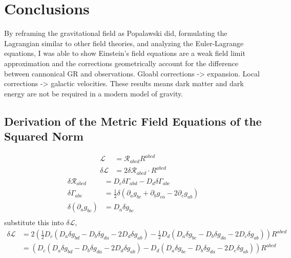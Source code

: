 \documentclass[aps,prd,preprint]{revtex4-1}
\begin{document}
\section*{Conclusions}
By reframing the gravitational field as Popalawski did, formulating the Lagrangian similar to other field theories, and analyzing the Euler-Lagrange equations, I was able to show Einstein's field equations are a weak field limit approximation and the corrections geometrically account for the difference between cannonical GR and observations. Gloabl corrections -> expansion. Local corrections -> galactic velocities. These results means dark matter and dark energy are not be required in a modern model of gravity.

\appendix

\begin{fleqn}
\section{Derivation of the Metric Field Equations of the Squared Norm}\label{app.derv_metric_field_eqs}
\begin{equation*}
\begin{aligned}
    \mathcal{L} &= \mathcal{R}_{abcd} R^{abcd} \\
    \delta \mathcal{L} &= 2 \delta \mathcal{R}_{abcd} \cdot R^{abcd}
\end{aligned}
\end{equation*}
\begin{equation*}
\begin{aligned}
    \delta \mathcal{R}_{abcd} &= D_c \delta \Gamma_{abd} - D_d \delta \Gamma_{abc} \\
    \delta \Gamma_{abc} &= \frac{1}{2} \delta(\partial_a g_{bc} + \partial_b g_{ca} - 2 \partial_c g_{ab}) \\
    \delta (\partial_a g_{bc}) &= D_a \delta g_{bc} \\
\end{aligned}
\end{equation*}
substitute this into $\delta \mathcal{L}$,
\begin{align*}
    \delta \mathcal{L} &= 2\left( \frac{1}{2} D_c (D_a \delta g_{bd} - D_b \delta g_{da} - 2 D_d \delta g_{ab}) - \frac{1}{2} D_d (D_a \delta g_{bc} - D_b \delta g_{da} - 2 D_c \delta g_{ab}) \right) R^{abcd} \\
    &= \left( D_c (D_a \delta g_{bd} - D_b \delta g_{da} - 2 D_d \delta g_{ab}) - D_d (D_a \delta g_{bc} - D_b \delta g_{da} - 2 D_c \delta g_{ab}) \right) R^{abcd}

\end{align*}
\end{fleqn}
\end{document}
